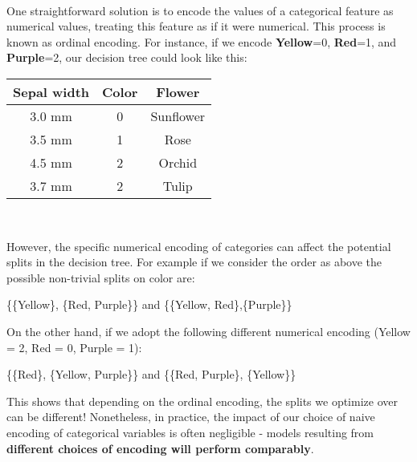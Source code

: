 \documentclass[11pt,a4paper]{report}
\begin{document}
\paragraph{}One straightforward solution is to encode the values of a categorical feature as numerical values, treating this feature as if it were numerical. This process is known as ordinal encoding. For instance, if we encode \textbf{Yellow}=0, \textbf{Red}=1, and \textbf{Purple}=2, our decision tree could look like this:\begin{center}
\begin{tabular}{ |c|c|c| } 
\hline
Sepal width&Color& Flower\\\hline\hline
3.0 mm & {\color{yellow}0}& Sunflower \\\hline
3.5 mm & {\color{red}1}& Rose \\\hline
4.5 mm & {\color{Plum}2}& Orchid\\\hline
3.7 mm & {\color{Plum}2}& Tulip\\\hline
\end{tabular}\\
\end{center}
However, the specific numerical encoding of categories can affect the potential splits in the decision tree. For example if we consider the order as above the possible non-trivial splits on color are:
\begin{center}
\{\{Yellow\}, \{Red, Purple\}\} and \{\{Yellow, Red\},\{Purple\}\}
\end{center}
On the other hand, if we adopt the following different numerical encoding (Yellow = 2, Red = 0, Purple = 1):
\begin{center}
\{\{Red\}, \{Yellow, Purple\}\} and \{\{Red, Purple\}, \{Yellow\}\}
\end{center}
This shows that depending on the ordinal encoding, the splits we optimize over can be different! Nonetheless, in practice, the impact of our choice of naive encoding of categorical variables is often negligible - models resulting from \textbf{different choices of encoding will perform comparably}.
\end{document}
